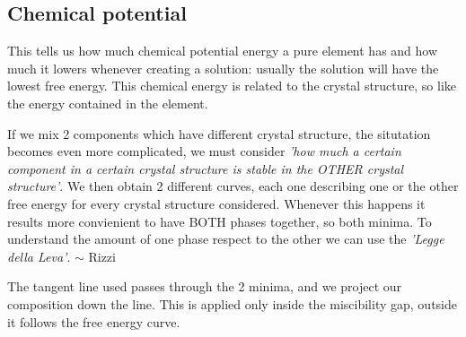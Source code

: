 \subsection{Chemical potential}

This tells us how much chemical potential energy a pure element has and how much it lowers whenever creating a solution: usually the solution will have the lowest free energy. This chemical energy is related to the crystal structure, so like the energy contained in the element.

\vspace{15pt}

\noindent If we mix 2 components which have different crystal structure, the situtation becomes even more complicated, we must consider \textit{'how much a certain component in a certain crystal structure is stable in the OTHER crystal structure'}. We then obtain 2 different curves, each one describing one or the other free energy for every crystal structure considered. Whenever this happens it results more convienient to have BOTH phases together, so both minima. To understand the amount of one phase respect to the other we can use the \textit{'Legge della Leva'}. $\sim$ Rizzi

The tangent line used passes through the 2 minima, and we project our composition down the line. This is applied only inside the miscibility gap, outside it follows the free energy curve.